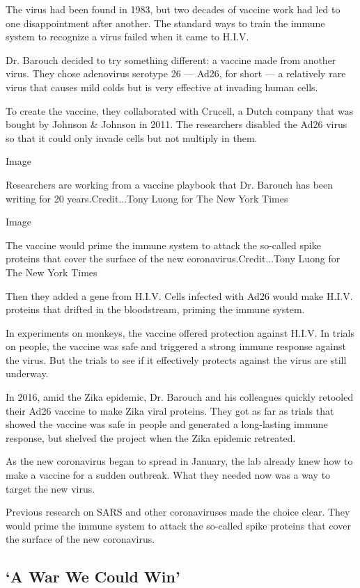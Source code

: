 The virus had been found in 1983, but two decades of vaccine work had
led to one disappointment after another. The standard ways to train the
immune system to recognize a virus failed when it came to H.I.V.

Dr. Barouch decided to try something different: a vaccine made from
another virus. They chose adenovirus serotype 26 --- Ad26, for short ---
a relatively rare virus that causes mild colds but is very effective at
invading human cells.

To create the vaccine, they collaborated with Crucell, a Dutch company
that was bought by Johnson \& Johnson in 2011. The researchers disabled
the Ad26 virus so that it could only invade cells but not multiply in
them.

Image

Researchers are working from a vaccine playbook that Dr. Barouch has
been writing for 20 years.Credit...Tony Luong for The New York Times

Image

The vaccine would prime the immune system to attack the so-called spike
proteins that cover the surface of the new coronavirus.Credit...Tony
Luong for The New York Times

Then they added a gene from H.I.V. Cells infected with Ad26 would make
H.I.V. proteins that drifted in the bloodstream, priming the immune
system.

In experiments on monkeys, the vaccine offered protection against H.I.V.
In trials on people, the vaccine was safe and triggered a strong immune
response against the virus. But the trials to see if it effectively
protects against the virus are still underway.

In 2016, amid the Zika epidemic, Dr. Barouch and his colleagues quickly
retooled their Ad26 vaccine to make Zika viral proteins. They got as far
as trials that showed the vaccine was safe in people and generated a
long-lasting immune response, but shelved the project when the Zika
epidemic retreated.

As the new coronavirus began to spread in January, the lab already knew
how to make a vaccine for a sudden outbreak. What they needed now was a
way to target the new virus.

Previous research on SARS and other coronaviruses made the choice clear.
They would prime the immune system to attack the so-called spike
proteins that cover the surface of the new coronavirus.

\hypertarget{a-war-we-could-win}{%
\subsection{`A War We Could Win'}\label{a-war-we-could-win}}

